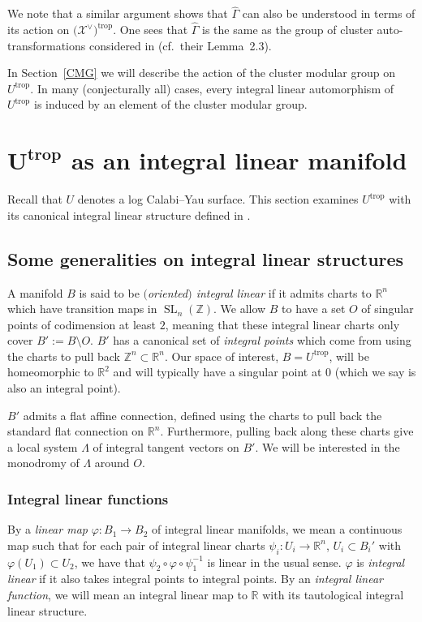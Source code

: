 \documentclass[11pt]{article}
\numberwithin{equation}{section}
\numberwithin{figure}{section}
\numberwithin{table}{section}
\DeclareMathOperator{\SL}{SL}
\DeclareMathOperator{\trop}{trop}
\let\bb=\mathbb
\let\rar=\rightarrow
\let\s=\mathcal
\let\wh=\widehat
\theoremstyle{definition}
\begin{document}
We note that a similar argument shows that $\wh{\Gamma}$ can also be understood in terms of its action on $\big(\s{X}^{\vee}\big)^{\trop}$. One sees that $\wh{\Gamma}$ is the same as the group of cluster auto-transformations considered in \cite{ASS} (cf.\ their Lemma~2.3).

In Section~\ref{CMG} we will describe the action of the cluster modular group on $U^{\trop}$. In many (conjecturally all) cases, every integral linear automorphism of $U^{\trop}$ is induced by an element of the cluster modular group.

\section[$U^{\trop}$ as an integral linear manifold]{$\boldsymbol{U^{\trop}}$ as an integral linear manifold} \label{tropu}
Recall that $U$ denotes a log Calabi--Yau surface. This section examines $U^{\trop}$ with its canonical integral linear structure defined in \cite{GHK1}.

\subsection{Some generalities on integral linear structures} \label{ils}

A manifold $B$ is said to be {\it $($oriented$)$ integral linear} if it admits charts to $\bb{R}^n$ which have transition maps in $\SL_n(\bb{Z})$. We allow $B$ to have a set $O$ of singular points of codimension at least $2$, meaning that these integral linear charts only cover $B':=B\setminus O$. $B'$ has a canonical set of {\it integral points} which come from using the charts to pull back $\bb{Z}^n\subset \bb{R}^n$. Our space of interest, $B=U^{\trop}$, will be homeomorphic to $\bb{R}^2$ and will typically have a singular point at $0$ (which we say is also an integral point).

$B'$ admits a flat affine connection, defined using the charts to pull back the standard flat connection on $\bb{R}^n$. Furthermore, pulling back along these charts give a local system $\Lambda$ of integral tangent vectors on $B'$. We will be interested in the monodromy of $\Lambda$ around $O$.

\subsubsection{Integral linear functions}\label{int lin fun}

By a {\it linear map} $\varphi\colon B_1\rar B_2$ of integral linear manifolds, we mean a continuous map such that for each pair of integral linear charts $\psi_i\colon U_i\rar \bb{R}^n$, $U_i\subset B_i'$ with $\varphi(U_1)\subset U_2$, we have that $\psi_2\circ \varphi\circ \psi_1^{-1}$ is linear in the usual sense. $\varphi$ is {\it integral linear} if it also takes integral points to integral points. By an {\it integral linear function}, we will mean an integral linear map to $\bb{R}$ with its tautological integral linear structure.
\end{document}
